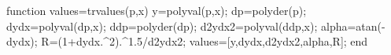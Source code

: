%
%
%

function values=trvalues(p,x)
    y=polyval(p,x);
    dp=polyder(p);
    dydx=polyval(dp,x);
    ddp=polyder(dp);
    d2ydx2=polyval(ddp,x);
    alpha=atan(-dydx);
    R=(1+dydx.^2).^1.5/d2ydx2;
    values=[y,dydx,d2ydx2,alpha,R];
end
